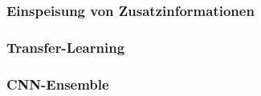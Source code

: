 \subsubsection{Einspeisung von Zusatzinformationen}

\subsubsection{Transfer-Learning}

\subsubsection{CNN-Ensemble}